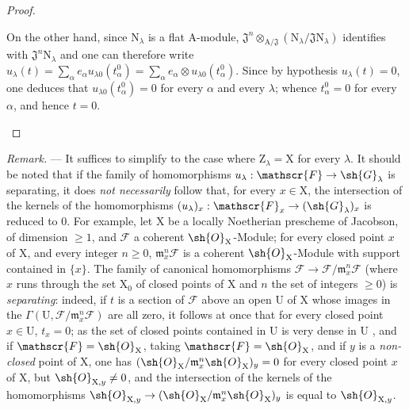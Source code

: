 \begin{proof}
\begin{enumerate}[label=(\roman*)]
  On the other hand, since $\mathrm{N}_\lambda$ is a flat $\mathrm{A}$-module, $\mathfrak{J}^n\otimes_{\mathrm{A}/\mathfrak{J}}(\mathrm{N}_\lambda/\mathfrak{J}\mathrm{N}_\lambda)$ identifies with $\mathfrak{J}^n\mathrm{N}_\lambda$ and one can therefore write $u_\lambda(t)=\sum_\alpha e_\alpha u_{\lambda 0}(t_\alpha^0)=\sum_\alpha e_\alpha\otimes u_{\lambda 0}(t_\alpha^0)$.
  Since by hypothesis $u_\lambda(t)=0$, one deduces that $u_{\lambda 0}(t_\alpha^0)=0$ for every $\alpha$ and every $\lambda$; whence $t_\alpha^0=0$ for every $\alpha$, and hence $t=0$.
\end{enumerate}
\end{proof}

\begin{remark}[11.9.11]
\label{IV.11.9.11}
\emph{Remark.} --- It suffices to simplify to the case where $\mathrm{Z}_\lambda=\mathrm{X}$ for every $\lambda$.
It should be noted that if the family of homomorphisms $u_\lambda:\mathscr{F}\to\sh{G}_\lambda$ is separating, it does \emph{not necessarily} follow that, for every $x\in\mathrm{X}$, the intersection of the kernels of the homomorphisms $(u_\lambda)_x:\mathscr{F}_x\to(\sh{G}_\lambda)_x$ is reduced to $0$.
For example, let $\mathrm{X}$ be a locally Noetherian prescheme of Jacobson, of dimension $\geq 1$, and $\mathscr{F}$ a coherent $\sh{O}_\mathrm{X}$-Module; for every closed point $x$ of $\mathrm{X}$, and every integer $n\geq 0$, $\mathfrak{m}_x^n\mathscr{F}$ is a coherent $\sh{O}_\mathrm{X}$-Module with support contained in $\{x\}$.
The family of canonical homomorphisms $\mathscr{F}\to\mathscr{F}/\mathfrak{m}_x^n\mathscr{F}$ (where $x$ runs through the set $\mathrm{X}_0$ of closed points of $\mathrm{X}$ and $n$ the set of integers $\geq 0$) is \emph{separating}: indeed, if $t$ is a section of $\mathscr{F}$ above an open $\mathrm{U}$ of $\mathrm{X}$ whose images in the $\Gamma(\mathrm{U},\mathscr{F}/\mathfrak{m}_x^n\mathscr{F})$ are all zero, it follows at once that for every closed point $x\in\mathrm{U}$, $t_x=0$; as the set of closed points contained in $\mathrm{U}$ is very dense in $\mathrm{U}$ , and if $\mathscr{F}=\sh{O}_\mathrm{X}$, taking $\mathscr{F}=\sh{O}_\mathrm{X}$, and if $y$ is a \emph{non-closed} point of $\mathrm{X}$, one has $(\sh{O}_\mathrm{X}/\mathfrak{m}_x^n\sh{O}_\mathrm{X})_y=0$ for every closed point $x$ of $\mathrm{X}$, but $\sh{O}_{\mathrm{X},y}\neq 0$, and the intersection of the kernels of the homomorphisms $\sh{O}_{\mathrm{X},y}\to(\sh{O}_\mathrm{X}/\mathfrak{m}_x^n\sh{O}_\mathrm{X})_y$ is equal to $\sh{O}_{\mathrm{X},y}$.
\end{remark}

